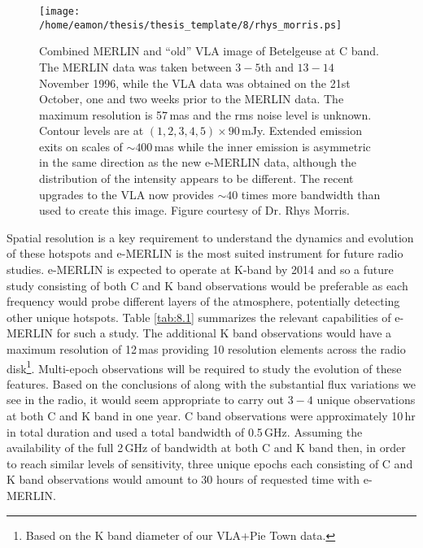 \begin{figure}[!ht]
\centering 
        \texttt{[image: /home/eamon/thesis/thesis\_template/8/rhys\_morris.ps]}
\caption[MERLIN $+$ ``old'' VLA image of Betelgeuse]{Combined MERLIN and ``old'' VLA image of Betelgeuse at C band. The MERLIN data was taken between $3-5$th and $13-14$ November 1996, while the VLA data was obtained on the 21st October, one and two weeks prior to the MERLIN data. The maximum resolution is 57\,mas and the rms noise level is unknown. Contour levels are at $(1,2,3,4,5)\times 90\,$mJy. Extended emission exits on scales of $\sim 400$\,mas while the inner emission is asymmetric in the same direction as the new e-MERLIN data, although the distribution of the intensity appears to be different. The recent upgrades to the VLA now provides $\sim 40$ times more bandwidth than used to create this image. Figure courtesy of Dr. Rhys Morris.} 
\label{fig:8.3}
\end{figure}

Spatial resolution is a key requirement to understand the dynamics and evolution of these hotspots and e-MERLIN is the most suited instrument for future radio studies. e-MERLIN is expected to operate at K-band by 2014 and so a future study consisting of both C and K band observations would be preferable as each frequency would probe different layers of the atmosphere, potentially detecting other unique hotspots. Table \ref{tab:8.1} summarizes the relevant capabilities of e-MERLIN for such a study. The additional K band observations would have a maximum resolution of 12\,mas providing 10 resolution elements across the radio disk\footnote{Based on the K band diameter of our VLA+Pie Town data.}. Multi-epoch observations will be required to study the evolution of these features. Based on the conclusions of \cite{ohnaka_2011} along with the substantial flux variations we see in the radio, it would seem appropriate to carry out $3-4$ unique observations at both C and K band in one year. \cite{richards_2013}  C band observations were approximately 10\,hr in total duration and used a total bandwidth of 0.5\,GHz. Assuming the availability of the full 2\,GHz of bandwidth at both C and K band then, in order to reach similar levels of sensitivity, three unique epochs each consisting of C and K band observations would amount to 30 hours of requested time with e-MERLIN.

